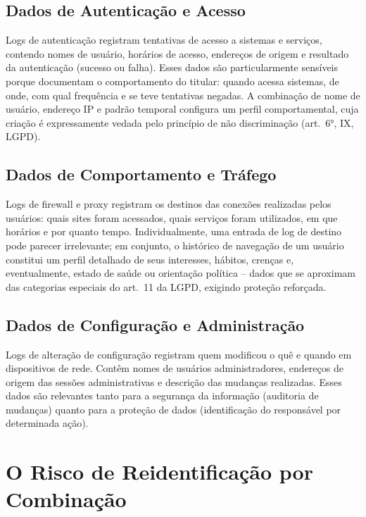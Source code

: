 \subsection{Dados de Autenticação e Acesso}
\label{subsec:dados-autenticacao}

Logs de autenticação registram tentativas de acesso a sistemas e serviços, contendo nomes de usuário, horários de acesso, endereços de origem e resultado da autenticação (sucesso ou falha). Esses dados são particularmente sensíveis porque documentam o comportamento do titular: quando acessa sistemas, de onde, com qual frequência e se teve tentativas negadas. A combinação de nome de usuário, endereço IP e padrão temporal configura um perfil comportamental, cuja criação é expressamente vedada pelo princípio de não discriminação (art.\ 6°, IX, LGPD).

\subsection{Dados de Comportamento e Tráfego}
\label{subsec:dados-comportamento}

Logs de firewall e proxy registram os destinos das conexões realizadas pelos usuários: quais sites foram acessados, quais serviços foram utilizados, em que horários e por quanto tempo. Individualmente, uma entrada de log de destino pode parecer irrelevante; em conjunto, o histórico de navegação de um usuário constitui um perfil detalhado de seus interesses, hábitos, crenças e, eventualmente, estado de saúde ou orientação política -- dados que se aproximam das categorias especiais do art.\ 11 da LGPD, exigindo proteção reforçada.

\subsection{Dados de Configuração e Administração}
\label{subsec:dados-admin}

Logs de alteração de configuração registram quem modificou o quê e quando em dispositivos de rede. Contêm nomes de usuários administradores, endereços de origem das sessões administrativas e descrição das mudanças realizadas. Esses dados são relevantes tanto para a segurança da informação (auditoria de mudanças) quanto para a proteção de dados (identificação do responsável por determinada ação).

\section{O Risco de Reidentificação por Combinação}
\label{sec:reidentificacao}

